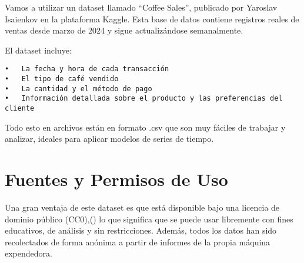\documentclass[
]{book}
\begin{document}
Vamos a utilizar un dataset llamado ``Coffee Sales'', publicado por Yaroslav Isaienkov en la plataforma Kaggle. Esta base de datos contiene registros reales de ventas desde marzo de 2024 y sigue actualizándose semanalmente.

El dataset incluye:

\begin{verbatim}
•   La fecha y hora de cada transacción
•   El tipo de café vendido
•   La cantidad y el método de pago
•   Información detallada sobre el producto y las preferencias del cliente
\end{verbatim}

Todo esto en archivos están en formato .csv que son muy fáciles de trabajar y analizar, ideales para aplicar modelos de series de tiempo.

\section{Fuentes y Permisos de Uso}\label{fuentes-y-permisos-de-uso}

Una gran ventaja de este dataset es que está disponible bajo una licencia de dominio público (CC0),(\citet{isaienkov2025}) lo que significa que se puede usar libremente con fines educativos, de análisis y sin restricciones. Además, todos los datos han sido recolectados de forma anónima a partir de informes de la propia máquina expendedora.

  
\end{document}
